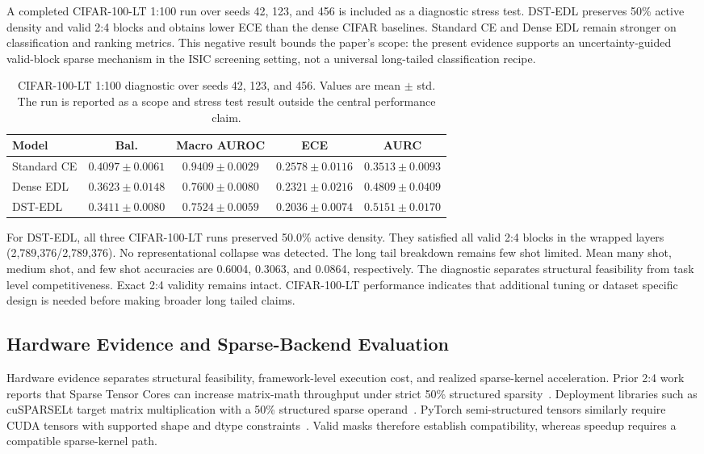 \documentclass[letterpaper]{article}
\begin{document}
A completed CIFAR-100-LT 1:100 run over seeds 42, 123, and 456 is included as a diagnostic stress test. DST-EDL preserves 50\% active density and valid 2:4 blocks and obtains lower ECE than the dense CIFAR baselines. Standard CE and Dense EDL remain stronger on classification and ranking metrics. This negative result bounds the paper's scope: the present evidence supports an uncertainty-guided valid-block sparse mechanism in the ISIC screening setting, not a universal long-tailed classification recipe.

\begin{table}[tbp]
\centering
\scriptsize
\caption{CIFAR-100-LT 1:100 diagnostic over seeds 42, 123, and 456. Values are mean $\pm$ std. The run is reported as a scope and stress test result outside the central performance claim.}
\label{tab:cifar_ir100_diagnostic}
\setlength{\tabcolsep}{1.8pt}
\begin{adjustbox}{max width=\columnwidth}
\begin{tabular}{@{}l C C C C@{}}
\toprule
Model & Bal. & Macro AUROC & ECE & AURC \\
\midrule
Standard CE & $0.4097\pm0.0061$ & $\mathbf{0.9409\pm0.0029}$ & $0.2578\pm0.0116$ & $\mathbf{0.3513\pm0.0093}$ \\
Dense EDL & $0.3623\pm0.0148$ & $0.7600\pm0.0080$ & $0.2321\pm0.0216$ & $0.4809\pm0.0409$ \\
DST-EDL & $0.3411\pm0.0080$ & $0.7524\pm0.0059$ & $\mathbf{0.2036\pm0.0074}$ & $0.5151\pm0.0170$ \\
\bottomrule
\end{tabular}
\end{adjustbox}
\end{table}

For DST-EDL, all three CIFAR-100-LT runs preserved 50.0\% active density. They satisfied all valid 2:4 blocks in the wrapped layers (2,789,376/2,789,376). No representational collapse was detected. The long tail breakdown remains few shot limited. Mean many shot, medium shot, and few shot accuracies are 0.6004, 0.3063, and 0.0864, respectively. The diagnostic separates structural feasibility from task level competitiveness. Exact 2:4 validity remains intact. CIFAR-100-LT performance indicates that additional tuning or dataset specific design is needed before making broader long tailed claims.

\subsection{Hardware Evidence and Sparse-Backend Evaluation}
Hardware evidence separates structural feasibility, framework-level execution cost, and realized sparse-kernel acceleration. Prior 2:4 work reports that Sparse Tensor Cores can increase matrix-math throughput under strict 50\% structured sparsity~\cite{mishra2021accelerating}. Deployment libraries such as cuSPARSELt target matrix multiplication with a 50\% structured sparse operand~\cite{nvidiacusparselt}. PyTorch semi-structured tensors similarly require CUDA tensors with supported shape and dtype constraints~\cite{pytorchsemistructured}. Valid masks therefore establish compatibility, whereas speedup requires a compatible sparse-kernel path.
\end{document}
